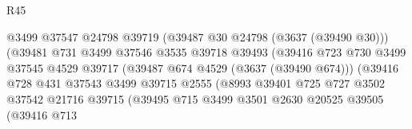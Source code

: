 \begin{lexlean}{R45}
\begin{coremodule}
                                              @3499
                                              @37547
                                              @24798
                                              @39719
                                              (@39487 @30 @24798 (@3637 (@39490 @30)))
                                              (@39481
                                                @731
                                                @3499
                                                @37546
                                                @3535
                                                @39718
                                                @39493
                                                (@39416
                                                  @723
                                                  @730
                                                  @3499
                                                  @37545
                                                  @4529
                                                  @39717
                                                  (@39487 @674 @4529 (@3637 (@39490 @674)))
                                                  (@39416
                                                    @728
                                                    @431
                                                    @37543
                                                    @3499
                                                    @39715
                                                    @2555
                                                    (@8993
                                                      @39401
                                                      @725
                                                      @727
                                                      @3502
                                                      @37542
                                                      @21716
                                                      @39715
                                                      (@39495
                                                        @715
                                                        @3499
                                                        @3501
                                                        @2630
                                                        @20525
                                                        @39505
                                                        (@39416
                                                          @713

\end{coremodule}
\end{lexlean}
